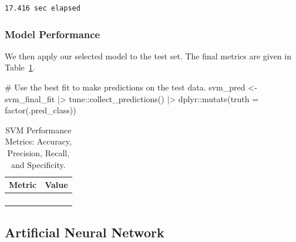 \documentclass[
  letterpaper,
  DIV=11,
  numbers=noendperiod]{scrartcl}
\newenvironment{Shaded}{\begin{snugshade}}{\end{snugshade}}
\newcommand{\AttributeTok}[1]{\textcolor[rgb]{0.40,0.45,0.13}{#1}}
\newcommand{\CommentTok}[1]{\textcolor[rgb]{0.37,0.37,0.37}{#1}}
\newcommand{\FunctionTok}[1]{\textcolor[rgb]{0.28,0.35,0.67}{#1}}
\newcommand{\NormalTok}[1]{\textcolor[rgb]{0.00,0.23,0.31}{#1}}
\newcommand{\OtherTok}[1]{\textcolor[rgb]{0.00,0.23,0.31}{#1}}
\newcommand{\SpecialCharTok}[1]{\textcolor[rgb]{0.37,0.37,0.37}{#1}}
\begin{document}
\begin{verbatim}
17.416 sec elapsed
\end{verbatim}

\subsubsection{Model Performance}\label{model-performance-1}

We then apply our selected model to the test set. The final metrics are
given in Table~\ref{tbl-svm-performance}.

\begin{Shaded}
\begin{Highlighting}[]
\CommentTok{\# Use the best fit to make predictions on the test data.}
\NormalTok{svm\_pred }\OtherTok{\textless{}{-}} 
\NormalTok{  svm\_final\_fit }\SpecialCharTok{|\textgreater{}} 
\NormalTok{  tune}\SpecialCharTok{::}\FunctionTok{collect\_predictions}\NormalTok{() }\SpecialCharTok{|\textgreater{}}
\NormalTok{  dplyr}\SpecialCharTok{::}\FunctionTok{mutate}\NormalTok{(}\AttributeTok{truth =} \FunctionTok{factor}\NormalTok{(.pred\_class))}
\end{Highlighting}
\end{Shaded}

\begin{longtable}{>{\raggedright\arraybackslash}p{}>{\raggedleft\arraybackslash}p{}}

\caption{\label{tbl-svm-performance}SVM Performance Metrics: Accuracy,
Precision, Recall, and Specificity.}

\tabularnewline

\toprule
Metric & Value \\ 
\midrule\addlinespace[2.5pt]
\cellcolor[HTML]{FFFFFF}{Accuracy} & \cellcolor[HTML]{FFFFFF}{78.0} \\ 
\cellcolor[HTML]{FFFFFF}{Precision} & \cellcolor[HTML]{FFFFFF}{23.1} \\ 
\cellcolor[HTML]{FFFFFF}{Recall} & \cellcolor[HTML]{FFFFFF}{100.0} \\ 
\cellcolor[HTML]{FFFFFF}{Specificity} & \cellcolor[HTML]{FFFFFF}{76.5} \\ 
\bottomrule

\end{longtable}

\subsection{Artificial Neural Network}\label{artificial-neural-network}
\end{document}
